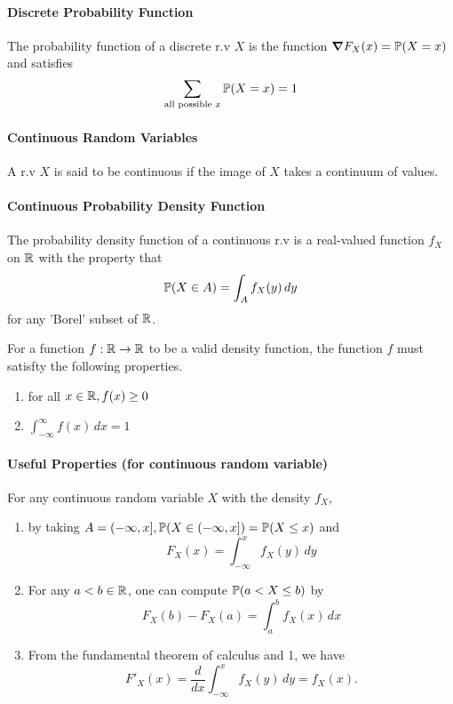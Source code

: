 \paragraph{Discrete Probability Function}
The probability function of a discrete r.v \(X\) is the function \(\grad F_X(x) = \mathbb{P}(X = x)\) and satisfies
\[\sum_{\text{all possible } x} \mathbb{P}(X = x) = 1\]

\paragraph{Continuous Random Variables}
A r.v \(X\) is said to be continuous if the image of \(X\) takes a continuum of values.

\paragraph{Continuous Probability Density Function}
The probability density function of a continuous r.v is a real-valued function \(f_X\) on \(\mathbb{R}\) with the property that 
\[\mathbb{P}(X \in A) = \int_A f_X(y) \, dy\]
for any 'Borel' subset of \(\mathbb{R}\).

For a function \(f: \mathbb{R} \to \mathbb{R}\) to be a valid density function, the function \(f\) must satisfty the following properties. 
\begin{enumerate}
    \item for all \(x \in \mathbb{R}, f(x) \geq 0\)
    \item \(\int_{-\infty}^{\infty} f(x) \, dx = 1\)
\end{enumerate}

\paragraph{Useful Properties (for continuous random variable)}
For any continuous random variable \(X\) with the density \(f_X\),
\begin{enumerate}
    \item by taking \(A = ( -\infty, x], \mathbb{P}(X \in (-\infty, x]) = \mathbb{P}(X \leq x)\) and 
    \[F_X(x) = \int_{-\infty}^x f_X(y) \, dy\]
    \item For any \(a < b \in \mathbb{R}\), one can compute \(\mathbb{P}(a < X \leq b)\) by 
    \[F_X(b) - F_X(a) = \int_a^b f_X(x) \, dx\]
    \item From the fundamental theorem of calculus and 1, we have
    \[F'_X(x) = \frac{d}{dx}\int_{-\infty}^x f_X(y) \, dy = f_X(x).\]
\end{enumerate}

